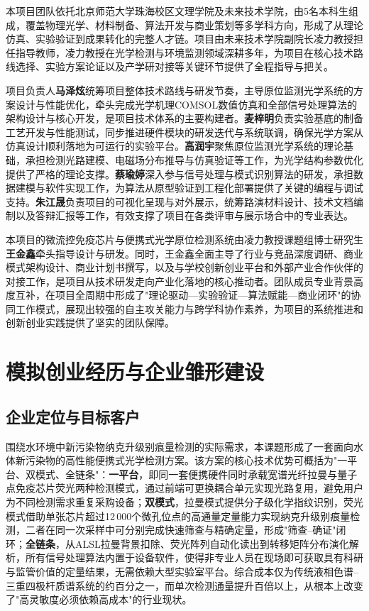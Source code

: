 \documentclass[12pt,a4paper]{article}
\begin{document}
本项目团队依托北京师范大学珠海校区文理学院及未来技术学院，由5名本科生组成，覆盖物理光学、材料制备、算法开发与商业策划等多学科方向，形成了从理论仿真、实验验证到成果转化的完整人才链。项目由未来技术学院副院长凌力教授担任指导教师，凌力教授在光学检测与环境监测领域深耕多年，为项目在核心技术路线选择、实验方案论证以及产学研对接等关键环节提供了全程指导与把关。

项目负责人\textbf{马泽炫}统筹项目整体技术路线与研发节奏，主导原位监测光学系统的方案设计与性能优化，牵头完成光学机理COMSOL数值仿真和全部信号处理算法的架构设计与核心开发，是项目技术体系的主要构建者。\textbf{麦梓明}负责实验基底的制备工艺开发与性能测试，同步推进硬件模块的研发迭代与系统联调，确保光学方案从仿真设计顺利落地为可运行的实验平台。\textbf{高润宇}聚焦原位监测光学系统的理论基础，承担检测光路建模、电磁场分布推导与仿真验证等工作，为光学结构参数优化提供了严格的理论支撑。\textbf{蔡瑜婷}深入参与信号处理与模式识别算法的研发，承担数据建模与软件实现工作，为算法从原型验证到工程化部署提供了关键的编程与调试支持。\textbf{朱江晟}负责项目的可视化呈现与对外展示，统筹路演材料设计、技术文档编制以及答辩汇报等工作，有效支撑了项目在各类评审与展示场合中的专业表达。

本项目的微流控免疫芯片与便携式光学原位检测系统由凌力教授课题组博士研究生\textbf{王金鑫}牵头指导设计与研发。同时，王金鑫全面主导了行业与竞品深度调研、商业模式架构设计、商业计划书撰写，以及与学校创新创业平台和外部产业合作伙伴的对接工作，是项目从技术研发走向产业化落地的核心推动者。团队成员专业背景高度互补，在项目全周期中形成了"理论驱动—实验验证—算法赋能—商业闭环"的协同工作模式，展现出较强的自主攻关能力与跨学科协作素养，为项目的系统推进和创新创业实践提供了坚实的团队保障。

\section{模拟创业经历与企业雏形建设}

\subsection{企业定位与目标客户}

围绕水环境中新污染物纳克升级别痕量检测的实际需求，本课题形成了一套面向水体新污染物的高性能便携式光学检测方案。该方案的核心技术优势可概括为"一平台、双模式、全链条"：\textbf{一平台}，即同一套便携硬件同时承载宽谱光纤拉曼与量子点免疫芯片荧光两种检测模式，通过前端可更换耦合单元实现光路复用，避免用户为不同检测需求重复采购设备；\textbf{双模式}，拉曼模式提供分子级化学指纹识别，荧光模式借助单张芯片超过12\,000个微孔位点的高通量定量能力实现纳克升级别痕量检测，二者在同一次采样中可分别完成快速筛查与精确定量，形成"筛查--确证"闭环；\textbf{全链条}，从ALSL拉曼背景扣除、荧光阵列自动化读出到转移矩阵分布演化解析，所有信号处理算法内置于设备软件，使得非专业人员在现场即可获取具有科研与监管价值的定量结果，无需依赖大型实验室平台。综合成本仅为传统液相色谱--三重四极杆质谱系统的约百分之一，而单次检测通量提升百倍以上，从根本上改变了"高灵敏度必须依赖高成本"的行业现状。
\end{document}

